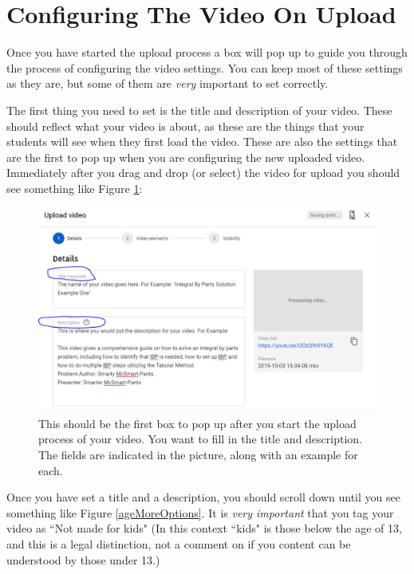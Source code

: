 \documentclass{article}
\begin{document}
    \section{Configuring The Video On Upload}
        
        Once you have started the upload process a box will pop up to guide you through the process of configuring the video settings. You can keep most of these settings as they are, but some of them are \textit{very} important to set correctly. 
        
        The first thing you need to set is the title and description of your video. These should reflect what your video is about, as these are the things that your students will see when they first load the video. These are also the settings that are the first to pop up when you are configuring the new uploaded video. Immediately after you drag and drop (or select) the video for upload you should see something like Figure \ref{titleDescription}:
        
        \begin{figure}[h]
            \includegraphics[width=\textwidth]{uploadedVideoTitleDescription.png}
            \caption{This should be the first box to pop up after you start the upload process of your video. You want to fill in the title and description. The fields are indicated in the picture, along with an example for each.}
            \label{titleDescription}
        \end{figure}
        
        \newpage
        
        Once you have set a title and a description, you should scroll down until you see something like Figure \ref{ageMoreOptions}. It is \textit{very important} that you tag your video as ``Not made for kids" (In this context ``kids" is those below the age of 13, and this is a legal distinction, not a comment on if you content can be understood by those under 13.)
    
\end{document}
